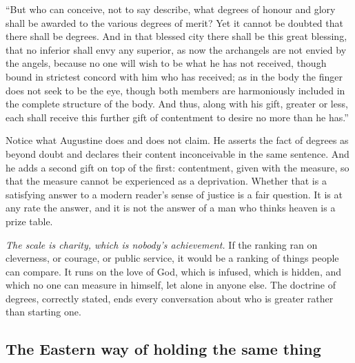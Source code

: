 \begin{studyframe}
``But who can conceive, not to say describe, what degrees of honour and glory shall be awarded to the various degrees of merit? Yet it cannot be doubted that there shall be degrees. And in that blessed city there shall be this great blessing, that no inferior shall envy any superior, as now the archangels are not envied by the angels, because no one will wish to be what he has not received, though bound in strictest concord with him who has received; as in the body the finger does not seek to be the eye, though both members are harmoniously included in the complete structure of the body. And thus, along with his gift, greater or less, each shall receive this further gift of contentment to desire no more than he has.''
\end{studyframe}

Notice what Augustine does and does not claim. He asserts the fact of degrees as beyond doubt and declares their content inconceivable in the same sentence. And he adds a second gift on top of the first: contentment, given with the measure, so that the measure cannot be experienced as a deprivation. Whether that is a satisfying answer to a modern reader's sense of justice is a fair question. It is at any rate the answer, and it is not the answer of a man who thinks heaven is a prize table.

\emph{The scale is charity, which is nobody's achievement.} If the ranking ran on cleverness, or courage, or public service, it would be a ranking of things people can compare. It runs on the love of God, which is infused, which is hidden, and which no one can measure in himself, let alone in anyone else. The doctrine of degrees, correctly stated, ends every conversation about who is greater rather than starting one.

\subsection{The Eastern way of holding the same thing}

